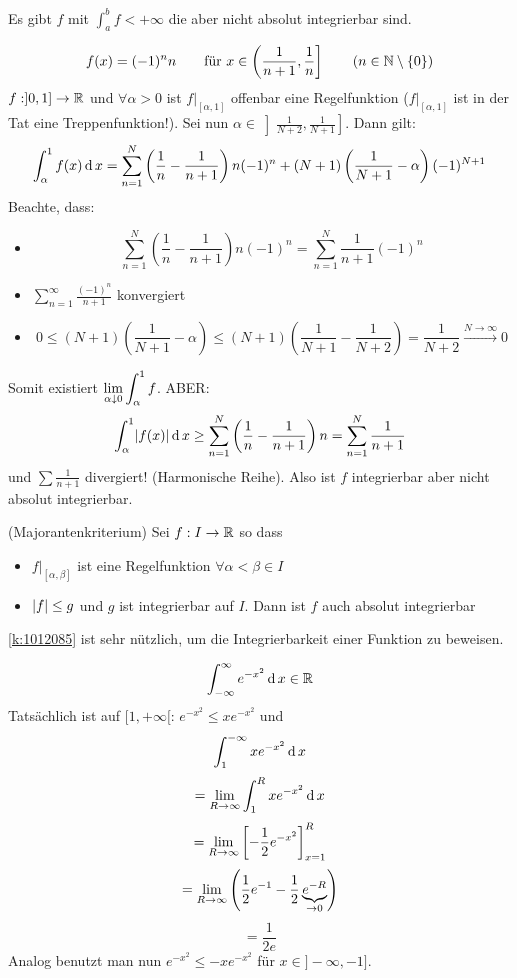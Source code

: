 \begin{Bsp} Es gibt $f$ mit $\int_a^bf < +\infty$ die aber nicht absolut integrierbar sind.
 
\[f(x)=(-1)^nn
\qquad
\mbox{für } x\in\left( \frac{1}{n+1},\frac{1}{n} \right] \qquad (n\in\mathbb{N}\setminus\left\{ 0 \right\})
\]
$f:]0,1]\to\mathbb{R}$ und $\forall \alpha>0$ ist $f|_{[\alpha,1]}$ offenbar 
eine Regelfunktion ($f|_{[\alpha, 1]}$ ist in der Tat eine Treppenfunktion!). 
Sei nun $\alpha\in\left] \frac{1}{N+2},\frac{1}{N+1} \right]$. Dann gilt:
  \[\int_\alpha^1f(x)\operatorname{d} x=\sum^N_{n=1}\left( \frac{1}{n}-\frac{1}{n+1} \right)n(-1)^n+(N+1)\left( \frac{1}{N+1}-\alpha \right)(-1)^{N+1}\]
  Beachte, dass:
  \begin{itemize}
    \item 
      \[\sum^N_{n=1}\left( \frac{1}{n}-\frac{1}{n+1} \right)n(-1)^n=\sum^N_{n=1}\frac{1}{n+1}(-1)^n\]
    \item $\sum^\infty_{n=1}\frac{(-1)^n}{n+1}$ konvergiert
    \item 
      \[0\leq (N+1)\left( \frac{1}{N+1}-\alpha \right)\leq(N+1)\left( \frac{1}{N+1}-\frac{1}{N+2} \right)=\frac{1}{N+2}\stackrel{N\to\infty}{\rightarrow}0\]
  \end{itemize}
  Somit existiert $\displaystyle\lim_{\alpha\downarrow 0}\int_\alpha^1f$. ABER:
  \[\int_\alpha^1\mathopen| f(x) \mathclose|\operatorname{d} x\geq \sum^N_{n=1}\left( \frac{1}{n}-\frac{1}{n+1} \right)n=\sum_{n=1}^N\frac{1}{n+1}\]
  und $\sum\frac{1}{n+1}$ divergiert! (Harmonische Reihe). Also ist $f$ integrierbar aber nicht absolut integrierbar.
\end{Bsp}
\begin{Kor}{(Majorantenkriterium)}\label{k:1012085}
  Sei $f:I\to\mathbb{R}$ so dass
  \begin{itemize}
    \item $f|_{[\alpha,\beta]}$ ist eine Regelfunktion $\forall \alpha<\beta\in I$
    \item $\mathopen| f \mathclose|\leq g$ und $g$ ist integrierbar auf $I$. Dann ist $f$ auch absolut integrierbar
  \end{itemize}
\end{Kor}
\begin{Bem}\ref{k:1012085} ist sehr n\"utzlich, um die Integrierbarkeit einer Funktion zu beweisen.
\end{Bem}
\begin{Bsp}
  \[\int_{-\infty}^\infty e^{-x^2}\operatorname{d} x\in\mathbb{R}\]
  Tats\"achlich ist auf $[1,+\infty[$: $e^{-x^2}\leq xe^{-x^2}$ und
  \[\int_1^{-\infty}xe^{-x^2}\operatorname{d} x\]
  \[=\displaystyle\lim_{R\rightarrow\infty}\int_1^Rxe^{-x^2}\operatorname{d} x\]
  \[=\displaystyle\lim_{R\rightarrow\infty}\left[ -\frac{1}{2}e^{-x^2} \right]_{x=1}^R\]
  \[=\displaystyle\lim_{R\rightarrow\infty}\left( \frac{1}{2}e^{-1}-\frac{1}{2}\underbrace{e^{-R}}_{\to 0} \right)\]
  \[=\frac{1}{2e}\]
  Analog benutzt man nun $e^{-x^2}\leq -xe^{-x^2}$ für $x\in]-\infty,-1]$.
\end{Bsp}

